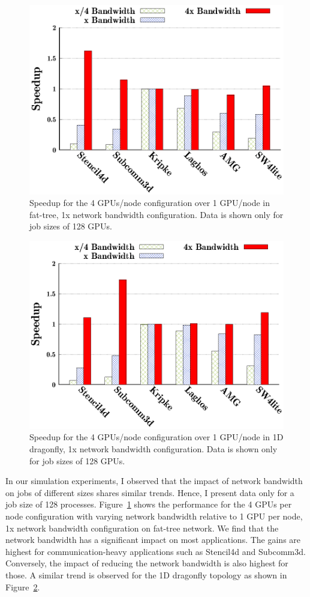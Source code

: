 \begin{figure}[t]
\centering
    \includegraphics[width=0.8\columnwidth]{figure/plots/bw/ftree-bw-mapping-all.eps}
  \caption{Speedup for the 4 GPUs/node configuration over 1 GPU/node in fat-tree, 1x network
  bandwidth configuration. Data is shown only for job sizes of 128 GPUs.}
  \label{fig:bw_ftree}
\end{figure}

\begin{figure}[t]
\centering
    \includegraphics[width=0.8\columnwidth]{figure/plots/bw/dfly-bw-mapping-all.eps}
  \caption{Speedup for the 4 GPUs/node configuration over 1 GPU/node in 1D dragonfly, 1x network
  bandwidth configuration. Data is shown only for job sizes of 128 GPUs.}
  \label{fig:bw_dfly}
\end{figure}

In our simulation experiments, I observed that the impact of network bandwidth on jobs of different sizes
shares similar trends. Hence, I present data only for a job size of 128 processes.
Figure~\ref{fig:bw_ftree} shows the performance for the 4 GPUs per node
configuration with varying network bandwidth relative to 1 GPU per node, 1x
network bandwidth configuration on fat-tree network. We find that the network
bandwidth has a significant impact on most applications.  The gains are  highest
for communication-heavy applications such as Stencil4d and Subcomm3d.
Conversely, the impact of reducing the network bandwidth is also highest for
those.  A similar trend is observed for the 1D dragonfly topology as
shown in Figure~\ref{fig:bw_dfly}.

